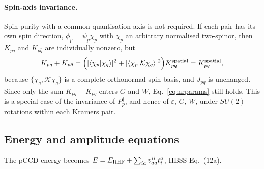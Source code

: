 \documentclass[11pt,a4paper]{article}
\newcommand{\kb}[1]{\bar{#1}}                 %
\newcommand{\Pd}[1]{P^{\dagger}_{#1}}
\begin{document}
\paragraph{Spin-axis invariance.} Spin purity with a common quantisation axis is not required.
If each pair has its own spin direction, $\phi_p=\psi_p\chi_p$ with $\chi_p$ an arbitrary normalised
two-spinor, then $K_{pq}$ and $K_{p\kb q}$ are individually nonzero, but
\begin{equation}
  K_{pq}+K_{p\kb q}=\Bigl(|\langle\chi_p|\chi_q\rangle|^2+|\langle\chi_p|\mathcal K\chi_q\rangle|^2\Bigr)K_{pq}^{\rm spatial}
  =K_{pq}^{\rm spatial},
\end{equation}
because $\{\chi_q,\mathcal K\chi_q\}$ is a complete orthonormal spin basis, and $J_{pq}$ is unchanged.
Since only the sum $K_{pq}+K_{p\kb q}$ enters $G$ and $W$, Eq.~\eqref{eq:nrparams} still holds.
This is a special case of the invariance of $\Pd p$, and hence of $\varepsilon$, $G$, $W$, under
$SU(2)$ rotations within each Kramers pair.

\subsection{Energy and amplitude equations}

The pCCD energy becomes $E=E_{\rm RHF}+\sum_{ia}v^{ii}_{aa}t^a_i$, HBSS Eq.~(12a).
\end{document}
